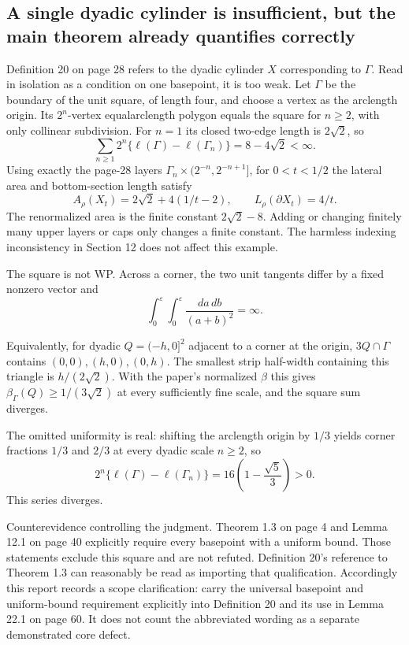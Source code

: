 \documentclass[10pt]{article}
\begin{document}
\subsection*{A single dyadic cylinder is insufficient, but the main theorem already quantifies correctly}
Definition 20 on page 28 refers to the dyadic cylinder \(X\) corresponding to \(\Gamma\). Read in isolation as a condition on one basepoint, it is too weak. Let \(\Gamma\) be the boundary of the unit square, of length four, and choose a vertex as the arclength origin. Its \(2^n\)-vertex equalarclength polygon equals the square for \(n\geq2\), with only collinear subdivision. For \(n=1\) its closed two-edge length is \(2\sqrt2\), so \[\sum_{n\geq1}2^n\{\ell(\Gamma)-\ell(\Gamma_n)\}=8-4\sqrt2<\infty.\] Using exactly the page-28 layers \(\Gamma_n\times(2^{-n},2^{-n+1}]\), for \(0<t<1/2\) the lateral area and bottom-section length satisfy \[A_\rho(X_t)=2\sqrt2+4(1/t-2),\qquad
 L_\rho(\partial X_t)=4/t.\] The renormalized area is the finite constant \(2\sqrt2-8\). Adding or changing finitely many upper layers or caps only changes a finite constant. The harmless indexing inconsistency in Section 12 does not affect this example.\par
The square is not WP. Across a corner, the two unit tangents differ by a fixed nonzero vector and \[\int_0^\varepsilon\int_0^\varepsilon\frac{da\,db}{(a+b)^2}=\infty.\]\par
Equivalently, for dyadic \(Q=(-h,0]^2\) adjacent to a corner at the origin, \(3Q\cap\Gamma\) contains \((0,0),(h,0),(0,h)\). The smallest strip half-width containing this triangle is \(h/(2\sqrt2)\). With the paper’s normalized \(\beta\) this gives \(\beta_\Gamma(Q)\geq1/(3\sqrt2)\) at every sufficiently fine scale, and the square sum diverges.\par
The omitted uniformity is real: shifting the arclength origin by \(1/3\) yields corner fractions \(1/3\) and \(2/3\) at every dyadic scale \(n\geq2\), so \[2^n\{\ell(\Gamma)-\ell(\Gamma_n)\}
 =16\left(1-\frac{\sqrt5}{3}\right)>0.\] This series diverges.\par
Counterevidence controlling the judgment. Theorem 1.3 on page 4 and Lemma 12.1 on page 40 explicitly require every basepoint with a uniform bound. Those statements exclude this square and are not refuted. Definition 20’s reference to Theorem 1.3 can reasonably be read as importing that qualification. Accordingly this report records a scope clarification: carry the universal basepoint and uniform-bound requirement explicitly into Definition 20 and its use in Lemma 22.1 on page 60. It does not count the abbreviated wording as a separate demonstrated core defect.\par
\end{document}
